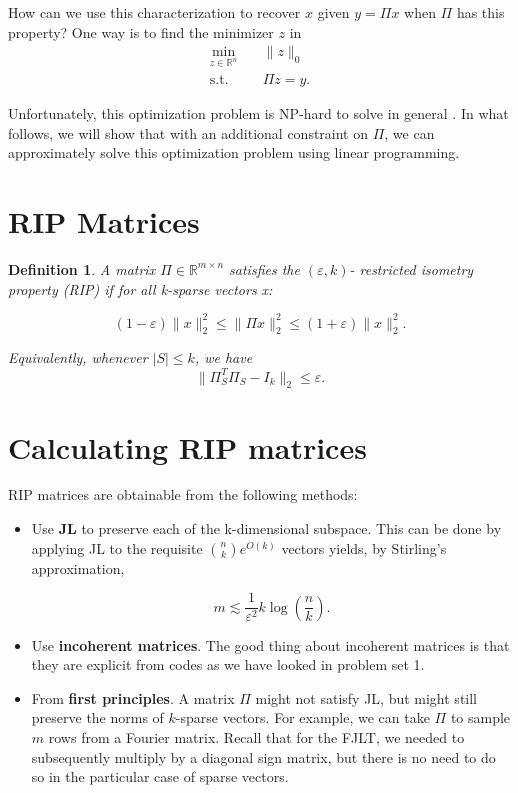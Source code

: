 \documentclass[11pt]{article}
\newcommand{\eps}{\varepsilon}
\newcommand{\R}{\mathbb{R}}
\newtheorem{definition}[theorem]{Definition}
\begin{document}
How can we use this characterization to recover $x$ given $y = \Pi x$ when $\Pi
$ has this property? One way is to find the minimizer $z$ in
\begin{align*}
	\min_{z \in \R^n} &\quad\|z\|_0 \\
	\text{s.t.} &\quad\Pi z = y.
\end{align*}

Unfortunately, this optimization problem is NP-hard to solve in general 
\cite[Problem MP5]{GJ79}. In what follows, we will show that with an additional 
constraint on $\Pi$, we can approximately solve this optimization problem using 
linear programming.




\section{RIP Matrices}
\begin{definition}
	A matrix $\Pi \in \R^{m\times n}$ satisfies the $(\eps,k)$-
	restricted isometry property (RIP) if for all k-sparse vectors 
	x:
	
	\[(1 - \eps) \|x\|_2^2 \le \|\Pi x\|_2^2 \le (1 + \eps) \|x\|
	_2^2.\]

	Equivalently, whenever $|S| \le k$, we have
	\[\|\Pi_S^T\Pi_S - I_k\|_2 \le \eps.\]
\end{definition}



\section{Calculating RIP matrices}

RIP matrices are obtainable from the following methods:

\begin{itemize}
	\item Use \textbf{JL} to preserve each of the 
	k-dimensional subspace. This 
	can be done by applying JL to the requisite ${n \choose k}
	 e^{O(k)}$ vectors yields, by Stirling's approximation,
	 
	\[m \lesssim \frac{1}{\eps^2}k \log \left(\frac{n}{k}\right).\]
	
	\item Use \textbf{incoherent matrices}. The good thing 
	about incoherent 
	matrices is that they are explicit from codes as we have looked 
	in problem set 1.
	
	\item From \textbf{first principles}. 
	A matrix $\Pi$ might not satisfy JL, but might 
	still preserve the norms of $k$-sparse vectors. For example, we can take $
	\Pi$ to sample $m$ rows from a Fourier matrix. Recall that for the FJLT, we 
	needed to subsequently multiply by a diagonal sign matrix, but there is no 
	need to do so in the particular case of sparse vectors.
\end{itemize}
\end{document}
